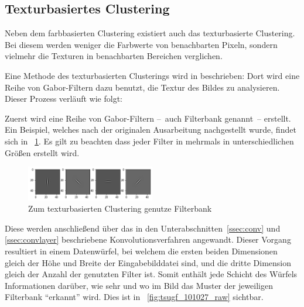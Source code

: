 \subsection{Texturbasiertes Clustering}

Neben dem farbbasierten Clustering existiert auch das texturbasierte Clustering. Bei diesem werden weniger die Farbwerte von benachbarten Pixeln, sondern vielmehr die Texturen in benachbarten Bereichen verglichen.

Eine Methode des texturbasierten Clusterings wird in \cite{jain_91} beschrieben: Dort wird eine Reihe von Gabor-Filtern dazu benutzt, die Textur des Bildes zu analysieren. Dieser Prozess verläuft wie folgt:

Zuerst wird eine Reihe von Gabor-Filtern --~auch Filterbank genannt~-- erstellt. Ein Beispiel, welches nach der originalen Ausarbeitung nachgestellt wurde, findet sich in \figurename~\ref{fig:tsugf_filters}. Es gilt zu beachten dass jeder Filter in mehrmals in unterschiedlichen Größen erstellt wird.

\begin{figure}[h!]
	\centering
	\includegraphics[width=0.5\textwidth,keepaspectratio]{images/gen/GEN_tsugf_filterbank.png}
	\captionsetup{width=0.5\textwidth,format=plain}
	\caption{Zum texturbasierten Clustering genutze Filterbank}
	\label{fig:tsugf_filters}
\end{figure}

Diese werden anschließend über das in den Unterabschnitten~\ref{ssec:conv} und \ref{ssec:convlayer} beschriebene Konvolutionsverfahren angewandt. Dieser Vorgang resultiert in einem Datenwürfel, bei welchem die ersten beiden Dimensionen gleich der Höhe und Breite der Eingabebilddatei sind, und die dritte Dimension gleich der Anzahl der genutzten Filter ist. Somit enthält jede Schicht des Würfels Informationen darüber, wie sehr und wo im Bild das Muster der jeweiligen Filterbank \enquote{erkannt} wird. Dies ist in \figurename~\ref{fig:tsugf_101027_raw} sichtbar.

